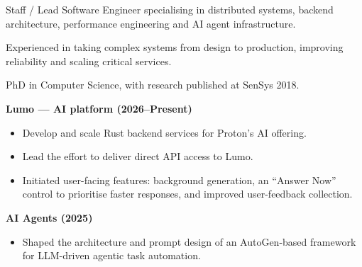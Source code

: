 \documentclass[10pt,a4paper]{../altacv}
\begin{document}
	
	
	\begin{fullwidth}
		\makecvheader
		
		Staff / Lead Software Engineer specialising in distributed systems, backend architecture, performance engineering and AI agent infrastructure.
		
		Experienced in taking complex systems from design to production, improving reliability and scaling critical services.
		
		\medskip
		
		PhD in Computer Science, with research published at SenSys 2018.
	\end{fullwidth}
	
	\small
	
	
	\medskip
	
	
	
	\textbf{Lumo — AI platform (2026--Present)}
	\begin{itemize}
		\item Develop and scale Rust backend services for Proton's AI offering.
		\item Lead the effort to deliver direct API access to Lumo.
		\item Initiated user-facing features: background generation, an ``Answer Now'' control to prioritise faster responses, and improved user-feedback collection.
	\end{itemize}
	
	\textbf{AI Agents (2025)}
	\begin{itemize}
		\item Shaped the architecture and prompt design of an AutoGen-based framework for LLM-driven agentic task automation.
	\end{itemize}
	
\end{document}
